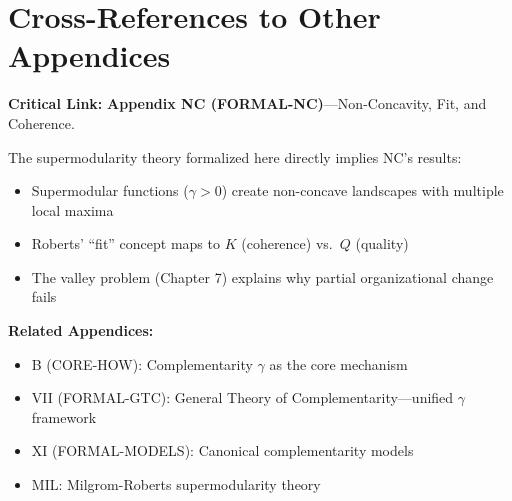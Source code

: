 \section{Cross-References to Other Appendices}
\label{sec:fnd-crossref}

\begin{tcolorbox}[colback=gray!5!white, colframe=gray!50!black]
\textbf{Critical Link:} \textbf{Appendix NC (FORMAL-NC)}---Non-Concavity, Fit, and Coherence.

The supermodularity theory formalized here directly implies NC's results:
\begin{itemize}[nosep]
\item Supermodular functions ($\gamma > 0$) create non-concave landscapes with multiple local maxima
\item Roberts' ``fit'' concept maps to $K$ (coherence) vs.\ $Q$ (quality)
\item The valley problem (Chapter 7) explains why partial organizational change fails
\end{itemize}

\textbf{Related Appendices:}
\begin{itemize}[nosep]
\item B (CORE-HOW): Complementarity $\gamma$ as the core mechanism
\item VII (FORMAL-GTC): General Theory of Complementarity---unified $\gamma$ framework
\item XI (FORMAL-MODELS): Canonical complementarity models
\item MIL: Milgrom-Roberts supermodularity theory
\end{itemize}
\end{tcolorbox}



